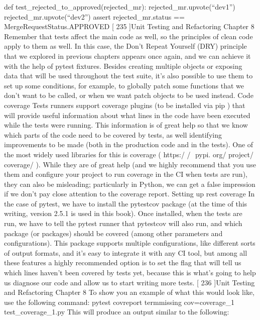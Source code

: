 \documentclass[a4paper,10pt,english]{sphinxmanual}
\begin{document}
def test\_rejected\_to\_approved(rejected\_mr):
rejected\_mr.upvote(“dev1”)
rejected\_mr.upvote(“dev2”)
assert rejected\_mr.status == MergeRequestStatus.APPROVED
{[} 235 {]}Unit Testing and Refactoring
Chapter 8
Remember that tests affect the main code as well, so the principles of clean code apply to
them as well. In this case, the Don’t Repeat Yourself (DRY) principle that we explored in
previous chapters appears once again, and we can achieve it with the help of pytest
fixtures.
Besides creating multiple objects or exposing data that will be used throughout the test
suite, it’s also possible to use them to set up some conditions, for example, to globally patch
some functions that we don’t want to be called, or when we want patch objects to be used
instead.
Code coverage
Tests runners support coverage plugins (to be installed via pip ) that will provide useful
information about what lines in the code have been executed while the tests were running.
This information is of great help so that we know which parts of the code need to be
covered by tests, as well identifying improvements to be made (both in the production code
and in the tests). One of the most widely used libraries for this is coverage ( https:/​ / ​ pypi.
org/​ project/​ coverage/​ ).
While they are of great help (and we highly recommend that you use them and configure
your project to run coverage in the CI when tests are run), they can also be misleading;
particularly in Python, we can get a false impression if we don’t pay close attention to the
coverage report.
Setting up rest coverage
In the case of pytest, we have to install the pytest\sphinxhyphen{}cov package (at the time of this
writing, version 2.5.1 is used in this book). Once installed, when the tests are run, we have
to tell the pytest runner that pytest\sphinxhyphen{}cov will also run, and which package (or packages)
should be covered (among other parameters and configurations).
This package supports multiple configurations, like different sorts of output formats, and
it’s easy to integrate it with any CI tool, but among all these features a highly recommended
option is to set the flag that will tell us which lines haven’t been covered by tests yet,
because this is what’s going to help us diagnose our code and allow us to start writing more
tests.
{[} 236 {]}Unit Testing and Refactoring
Chapter 8
To show you an example of what this would look like, use the following command:
pytest \textendash{}cov\sphinxhyphen{}report term\sphinxhyphen{}missing \textendash{}cov=coverage\_1 test\_coverage\_1.py
This will produce an output similar to the following:
\end{document}
